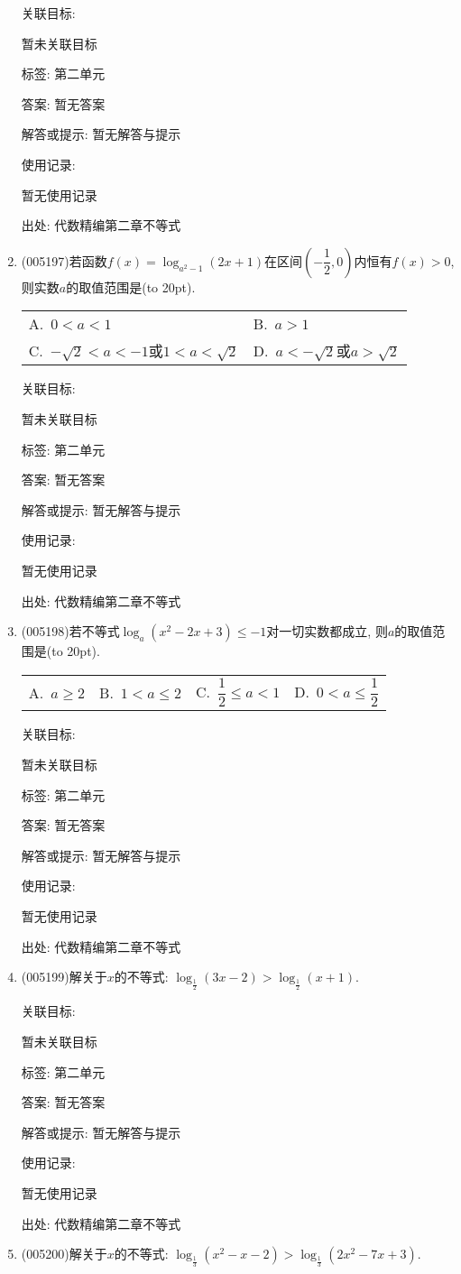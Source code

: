 \documentclass[10pt,a4paper]{article}
\newcommand{\bracket}[1]{(\hbox to #1pt{})}
\newcommand{\twoch}[4]{\par\begin{tabular}{p{.46\textwidth}p{.46\textwidth}}
A.~#1& B.~#2\\
C.~#3& D.~#4
\end{tabular}}
\newcommand{\fourch}[4]{\par\begin{tabular}{p{.23\textwidth}p{.23\textwidth}p{.23\textwidth}p{.23\textwidth}}
A.~#1 &B.~#2& C.~#3& D.~#4
\end{tabular}}
\begin{document}
\begin{enumerate}[1.]
关联目标:

暂未关联目标



标签: 第二单元

答案: 暂无答案

解答或提示: 暂无解答与提示

使用记录:

暂无使用记录


出处: 代数精编第二章不等式
\item { (005197)}若函数$f(x)=\log_{a^2-1}(2x+1)$在区间$(-\dfrac 12,0)$内恒有$f(x)>0$, 则实数$a$的取值范围是\bracket{20}.
\twoch{$0<a<1$}{$a>1$}{$-\sqrt 2<a<-1$或$1<a<\sqrt 2$}{$a<-\sqrt 2$或$a>\sqrt 2$}


关联目标:

暂未关联目标



标签: 第二单元

答案: 暂无答案

解答或提示: 暂无解答与提示

使用记录:

暂无使用记录


出处: 代数精编第二章不等式
\item { (005198)}若不等式$\log_a(x^2-2x+3)\le -1$对一切实数都成立, 则$a$的取值范围是\bracket{20}.
\fourch{$a\ge 2$}{$1<a\le 2$}{$\dfrac 12\le a<1$}{$0<a\le \dfrac 12$}


关联目标:

暂未关联目标



标签: 第二单元

答案: 暂无答案

解答或提示: 暂无解答与提示

使用记录:

暂无使用记录


出处: 代数精编第二章不等式
\item { (005199)}解关于$x$的不等式: $\log_{\frac 12}(3x-2)>\log_{\frac 12}(x+1)$.


关联目标:

暂未关联目标



标签: 第二单元

答案: 暂无答案

解答或提示: 暂无解答与提示

使用记录:

暂无使用记录


出处: 代数精编第二章不等式
\item { (005200)}解关于$x$的不等式: $\log_{\frac 13}(x^2-x-2)>\log_{\frac 13}(2x^2-7x+3)$.



\end{enumerate}
\end{document}
